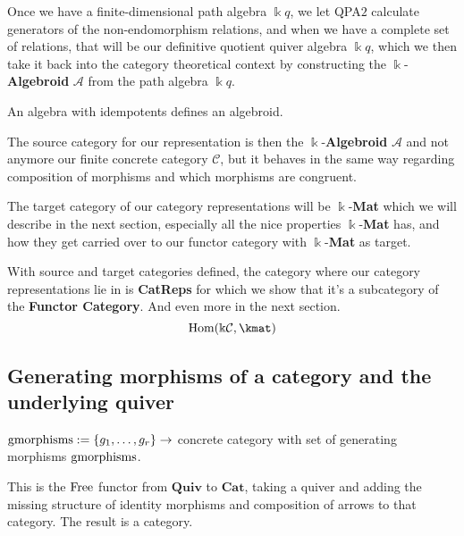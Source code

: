 Once we have a finite-dimensional path algebra $\Bbbk q$, we let \textsc{QPA$2$} calculate generators of the non-endomorphism relations,
and when we have a complete set of relations, that will be our definitive quotient quiver algebra $\Bbbk q$, which we then take it back into the category
theoretical context by constructing the $\Bbbk$-\textbf{Algebroid} $\mathcal{A}$ from the path algebra $\Bbbk q$.

An algebra with idempotents defines an algebroid.

The source category for our representation is then the $\Bbbk$-\textbf{Algebroid} $\mathcal{A}$ and not anymore our finite concrete
category $\mathcal{C}$, but it behaves in the same way regarding composition of morphisms and which morphisms are congruent.

The target category of our category representations will be $\Bbbk$-\textbf{Mat} which we will describe in the next section,
especially all the nice properties $\Bbbk$-\textbf{Mat} has, and how they get carried over to our functor category with $\Bbbk$-\textbf{Mat} as
target.

With source and target categories defined, the category where our category representations lie in is \textbf{CatReps} for which we
show that it's a subcategory of the \textbf{Functor Category}. And even more in the next section.
\[
\textup{Hom}(\Bbbk\mathcal{C}, \kmat)
\]

\subsection{Generating morphisms of a category and the underlying quiver}

$\textup{gmorphisms} := \{g_{1},\dots,g_{r}\} \rightarrow$ concrete category with set of generating morphisms $\textup{gmorphisms}$.

This is the $\textup{Free}$ functor from $\mathbf{Quiv}$ to $\mathbf{Cat}$, taking a quiver and adding the missing structure of
identity morphisms and composition of arrows to that category. The result is a category.

